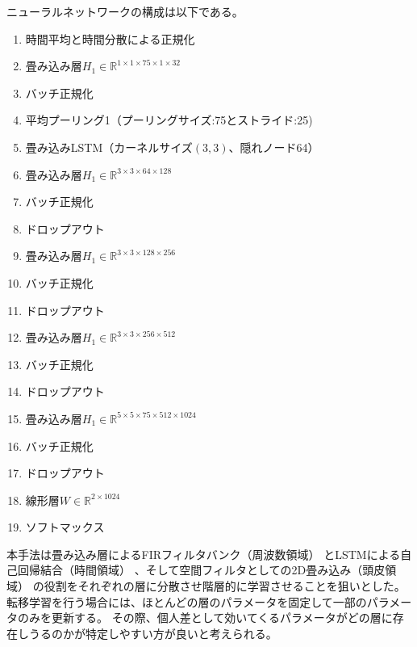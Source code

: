ニューラルネットワークの構成は以下である。
\begin{enumerate}
    \item 時間平均と時間分散による正規化
    \item 畳み込み層\(H_1 \in \mathbb R^{1 \times 1 \times 75 \times 1 \times 32}\)
    \item バッチ正規化
    \item 平均プーリング1（プーリングサイズ:75とストライド:25)
    \item 畳み込みLSTM（カーネルサイズ\((3, 3)\)、隠れノード64）
    \item 畳み込み層\(H_1 \in \mathbb R^{3 \times 3 \times 64 \times 128}\)
    \item バッチ正規化    
    \item ドロップアウト
    \item 畳み込み層\(H_1 \in \mathbb R^{3 \times 3 \times 128 \times 256}\)
    \item バッチ正規化    
    \item ドロップアウト
    \item 畳み込み層\(H_1 \in \mathbb R^{3 \times 3 \times 256 \times 512}\)
    \item バッチ正規化    
    \item ドロップアウト
    \item 畳み込み層\(H_1 \in \mathbb R^{5 \times 5 \times 75 \times 512 \times 1024}\)
    \item バッチ正規化    
    \item ドロップアウト
    \item 線形層\(W \in \mathbb R^{2\times 1024}\)
    \item ソフトマックス
\end{enumerate}

本手法は畳み込み層によるFIRフィルタバンク（周波数領域）
とLSTMによる自己回帰結合（時間領域）
、そして空間フィルタとしての2D畳み込み（頭皮領域）
の役割をそれぞれの層に分散させ階層的に学習させることを狙いとした。
転移学習を行う場合には、ほとんどの層のパラメータを固定して一部のパラメータのみを更新する。
その際、個人差として効いてくるパラメータがどの層に存在しうるのかが特定しやすい方が良いと考えられる。